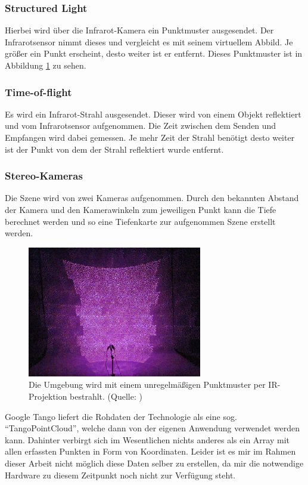 \subsubsection{Structured Light}
Hierbei wird über die Infrarot-Kamera ein Punktmuster ausgesendet. Der Infrarotsensor nimmt dieses und vergleicht es mit seinem virtuellem Abbild. Je größer ein Punkt erscheint, desto weiter ist er entfernt. Dieses Punktmuster ist in Abbildung \ref{tango_ir_projection} zu sehen.
\subsubsection{Time-of-flight}
Es wird ein Infrarot-Strahl ausgesendet. Dieser wird von einem Objekt reflektiert und vom Infrarotsensor aufgenommen. Die Zeit zwischen dem Senden und Empfangen wird dabei gemessen. Je mehr Zeit der Strahl benötigt desto weiter ist der Punkt von dem der Strahl reflektiert wurde entfernt.
\subsubsection{Stereo-Kameras}
Die Szene wird von zwei Kameras aufgenommen. Durch den bekannten Abstand der Kamera und den Kamerawinkeln zum jeweiligen Punkt kann die Tiefe berechnet werden und so eine Tiefenkarte zur aufgenommen Szene erstellt werden.

\begin{figure}[h]
	\centering
	\includegraphics[width=3in]{pictures/tango_ir_projection}
	\caption{Die Umgebung wird mit einem unregelmäßigen Punktmuster per IR-Projektion bestrahlt. (Quelle: \cite{tango_teardown})}
	\label{tango_ir_projection}
\end{figure}

Google Tango liefert die Rohdaten der Technologie als eine sog. "`TangoPointCloud"', welche dann von der eigenen Anwendung verwendet werden kann. Dahinter verbirgt sich im Wesentlichen nichts anderes als ein Array mit allen erfassten Punkten in Form von Koordinaten. Leider ist es mir im Rahmen dieser Arbeit nicht möglich diese Daten selber zu erstellen, da mir die notwendige Hardware zu diesem Zeitpunkt noch nicht zur Verfügung steht.

